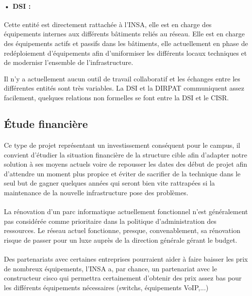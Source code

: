 \paragraph{• DSI :} Cette entité est directement rattachée à l'INSA, elle est en charge des équipements internes aux différents bâtiments reliés au réseau. Elle est en charge des équipements actifs et passifs dans les bâtiments, elle actuellement en phase de redéploiement d'équipements afin d'uniformiser les différents locaux techniques et de modernisr l'ensemble de l'infrastructure.

Il n'y a actuellement aucun outil de travail collaboratif et les échanges entre les différentes entités sont très variables. La DSI et la DIRPAT communiquent assez facilement, quelques relations non formelles se font entre la DSI et le CISR.


\subsection{Étude financière}

\paragraph{} Ce type de projet représentant un investissement conséquent pour le campus, il convient d'étudier la situation financière de la structure cible afin d'adapter notre solution à ses moyens actuels voire de repousser les dates des début de projet afin d'attendre un moment plus propice et éviter de sacrifier de la technique dans le seul but de gagner quelques années qui seront bien vite rattrapées si la maintenance de la nouvelle infrastructure pose des problèmes.

\paragraph{} La rénovation d'un parc informatique actuellement fonctionnel n'est généralement pas considérée comme prioritaire dans la politique d'administration des ressources. Le réseau actuel fonctionne, presque, convenablement, sa rénovation risque de passer pour un luxe auprès de la direction générale gérant le budget.

\paragraph{} Des partenariats avec certaines entreprises pourraient aider à faire baisser les prix de nombreux équipements, l'INSA a, par chance, un partenariat avec le constructeur cisco qui permettra certainement d'obtenir des prix assez bas pour les différents équipements nécessaires (switchs, équipements VoIP,...)

